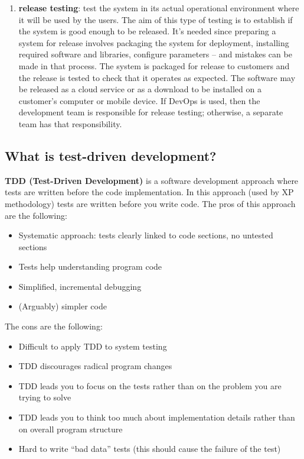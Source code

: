 \begin{enumerate}
\begin{itemize}
         \end{itemize}
   \item \textbf{release testing}: test the system in its actual operational environment where it will be used by the users. The aim of this type of testing is to establish if the system is good enough to be released.
         It's needed since preparing a system for release involves packaging the system for deployment, installing required software and libraries, configure parameters – and mistakes can be made in that process.
         The system is packaged for release to customers and the release is tested to check that it operates as expected. The software may be released as a cloud service or as a download to be installed on a customer’s computer or mobile device. If DevOps is used, then the development team is responsible for release testing;
         otherwise, a separate team has that responsibility.
\end{enumerate}

\subsection{What is test-driven development?}
\textbf{TDD (Test-Driven Development)} is a software development approach where tests are written before the code implementation. In this approach (used by XP methodology) tests are written before you write code.
The pros of this approach are the following:
\begin{itemize}
   \item Systematic approach: tests clearly linked to code sections, no untested sections
   \item Tests help understanding program code
   \item Simplified, incremental debugging
   \item (Arguably) simpler code
\end{itemize}
The cons are the following:
\begin{itemize}
   \item Difficult to apply TDD to system testing
   \item TDD discourages radical program changes
   \item TDD leads you to focus on the tests rather than on the problem you are trying to solve
   \item TDD leads you to think too much about implementation details rather than on overall program structure
   \item Hard to write “bad data” tests (this should cause the failure of the test)
\end{itemize}

